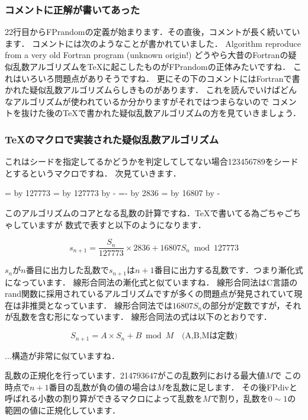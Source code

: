 \subsubsection{コメントに正解が書いてあった}
22行目からFPrandomの定義が始まります．その直後，コメントが長く続いています．
コメントには次のようなことが書かれていました．
Algorithm reproduce from a very old Fortran program (unknown origin!)
どうやら大昔のFortranの疑似乱数アルゴリズムを\TeX に起こしたものがFPrandomの正体みたいですね．
これはいろいろ問題点がありそうですね．
更にその下のコメントにはFortranで書かれた疑似乱数アルゴリズムらしきものがあります．
これを読んでいけばどんなアルゴリズムが使われているか分かりますがそれではつまらないので
コメントを抜けた後の\TeX で書かれた疑似乱数アルゴリズムの方を見ていきましょう．

\subsubsection{\TeX のマクロで実装された疑似乱数アルゴリズム}
\begin{texcode}
\ifnum{}%
\else%
\fi%
\end{texcode}
これはシードを指定してるかどうかを判定してしてない場合123456789をシードとするというマクロですね．
次見ていきます．
\begin{texcode}
\FP@xia=\FPseed%
\divide\FP@xia by 127773%
\FP@xib=\FP@xia%
\multiply\FP@xib by 127773%
\advance\FP@xib by -\FPseed%
\FP@xib=-\FP@xib%
\multiply\FP@xia by 2836%
\FPseed=\FP@xib%
\multiply\FPseed by 16807%
\advance\FPseed by -\FP@xia%
\end{texcode}
このアルゴリズムのコアとなる乱数の計算ですね．\TeX で書いてる為ごちゃごちゃしていますが
数式で表すと以下のようになります．

\[
s_{n+1} = \frac{S_n}{127773}\times 2836 + 16807S_n \bmod 127773
\]

$s_n$が$n$番目に出力した乱数で$s_{n+1}$は$n+1$番目に出力する乱数です．つまり漸化式になっています．
線形合同法の漸化式と似ていますね．
線形合同法はC言語のrand関数に採用されているアルゴリズムですが多くの問題点が発見されていて現在は非推奨となっています．
線形合同法では$16807S_n$の部分が定数ですが，それが乱数を含む形になっています．
線形合同法の式は以下のとおりです．

\[
S_{n+1}=A\times S_n + B \bmod M \quad \textrm{(A,B,Mは定数)}
\]

...構造が非常に似ていますね．

乱数の正規化を行っています．214793647がこの乱数列における最大値$M$で
この時点で$n+1$番目の乱数が負の値の場合は$M$を乱数に足します．
その後FPdivと呼ばれる小数の割り算ができるマクロによって乱数を$M$で割り，乱数を$0\sim 1$の範囲の値に正規化しています．
